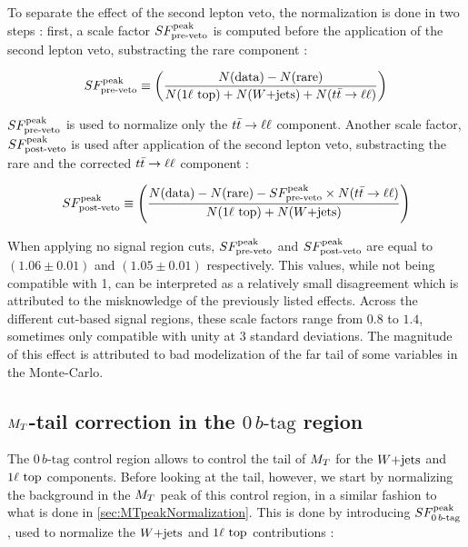     To separate the effect of the second lepton veto, the  normalization is done in two 
    steps : first, a scale factor $SF_{\text{pre-veto}}^{\text{peak}}$ is computed before the application of the 
    second lepton veto, substracting the rare component :

    \begin{equation}
        SF_{\text{pre-veto}}^{\text{peak}} \equiv \left( \frac{N(\text{data}) - N(\text{rare})}{N(1\ell~\text{top}) + N(\text{$W$+jets}) + N(t\bar{t} \rightarrow \ell \ell)} \right)
        \label{eq:SFpreDefinition}
    \end{equation}

    $SF_{\text{pre-veto}}^{\text{peak}}$ is used to normalize only the $t\bar{t} \rightarrow \ell \ell$ component. Another scale factor, 
    $SF_{\text{post-veto}}^{\text{peak}}$ is used after application of the second lepton veto, substracting the rare 
    and the corrected $t\bar{t} \rightarrow \ell \ell$ component :

    \begin{equation}
        SF_{\text{post-veto}}^{\text{peak}} \equiv \left( \frac{N(\text{data}) - N(\text{rare}) - SF_{\text{pre-veto}}^{\text{peak}} \times N(t\bar{t} \rightarrow \ell \ell)}{N(1\ell~\text{top}) + N(\text{$W$+jets})} \right)
        \label{eq:SFpostDefinition}
    \end{equation}

     When applying no signal region cuts, $SF_{\text{pre-veto}}^{\text{peak}}$ and $SF_{\text{post-veto}}^{\text{peak}}$ are equal to 
     $(1.06 \pm 0.01)$ and $(1.05 \pm 0.01)$ respectively. This values, while not
     being compatible with 1, can be interpreted as a relatively small disagreement
     which is attributed to the misknowledge of the previously listed effects. Across the
     different cut-based signal regions, these scale factors range from $0.8$ to $1.4$,
     sometimes only compatible with unity at 3 standard deviations. The magnitude of this
     effect is attributed to bad modelization of the far tail of some variables in the
     Monte-Carlo.

        \subsection{$M_T$-tail correction in the $0\, b\text{-tag}$ region \label{sec:MTtailCorrection}}

    The $0\, b\text{-tag}$ control region allows to control the tail of $M_T$ for the $\text{$W$+jets}$ and 
    $1\ell~\text{top}$ components. Before looking at the tail, however, we start by normalizing 
    the background in the $M_T$ peak of this control region, in a similar fashion to what 
    is done in \ref{sec:MTpeakNormalization}. This is done by introducing $SF_{0\, b\text{-tag}}^{\text{peak}}$, 
    used to normalize the $\text{$W$+jets}$ and $1\ell~\text{top}$ contributions :


